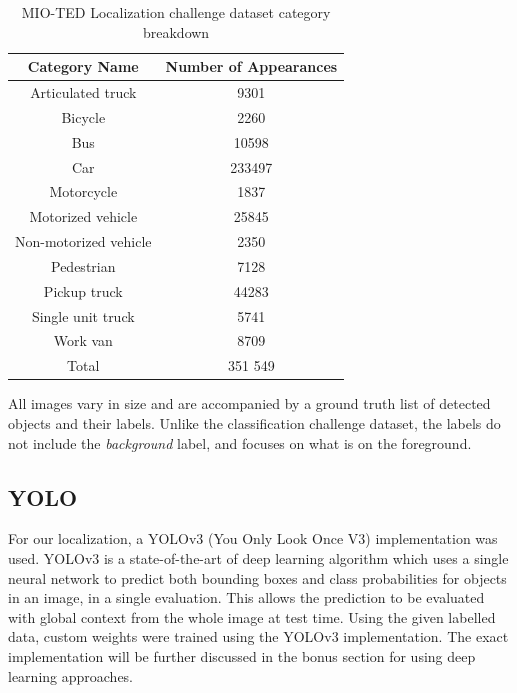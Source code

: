 \documentclass[12pt]{article}
\begin{document}
    \begin{table}[h] 
    \centering
        \begin{tabular}{ || c | c ||}
            \hline
            \hline
            Category Name           & Number of Appearances \\
            \hline
            Articulated truck       &  9301 \\
            Bicycle                 &  2260    \\
            Bus                     &  10598  \\
            Car                     &  233497 \\
            Motorcycle              &  1837    \\
            Motorized vehicle       &  25845 \\
            Non-motorized vehicle   &  2350  \\
            Pedestrian              &  7128  \\
            Pickup truck            &  44283 \\
            Single unit truck       &  5741  \\
            Work van                &  8709  \\
            \hline
            Total                   & 351 549   \\
            \hline
            \hline
        \end{tabular}
    \caption{MIO-TED Localization challenge dataset category breakdown}
    \end{table}

All images vary in size and are accompanied by a ground truth list of detected objects and their labels. Unlike the classification challenge dataset, the labels do not include the \textit{background} label, and focuses on what is on the foreground. 

\subsection{YOLO}

For our localization, a YOLOv3 (You Only Look Once V3) \cite{YOLO} implementation was used. YOLOv3 is a state-of-the-art of deep learning algorithm which uses a single neural network to predict both bounding boxes and class probabilities for objects in an image, in a single evaluation. This allows the prediction to be evaluated with global context from the whole image at test time. Using the given labelled data, custom weights were trained using the YOLOv3 implementation. The exact implementation will be further discussed in the bonus section for using deep learning approaches. \\
\end{document}
